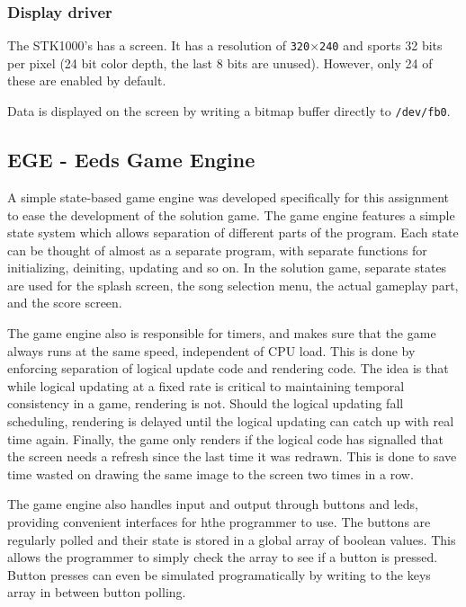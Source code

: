 \subsubsection{Display driver}
The STK1000's has a screen.
It has a resolution of \texttt{320}$\times$\texttt{240} and sports 32 bits per pixel (24 bit color depth, the last 8 bits are unused)\cite{lab-compendium}.
However, only 24 of these are enabled by default\cite{avr32-disp}.

Data is displayed on the screen by writing a bitmap buffer directly to \texttt{/dev/fb0}.


        \subsection{EGE  - Eeds Game Engine}

    A simple state-based game engine was developed specifically for this assignment to ease the development of the solution game.
    The game engine features a simple state system which allows separation of different parts of the program.
    Each state can be thought of almost as a separate program, with separate functions for initializing, deiniting, updating and so on.
    In the solution game, separate states are used for the splash screen, the song selection menu, the actual gameplay part, and the score screen.

    The game engine also is responsible for timers, and makes sure that the game always runs at the same speed, independent of CPU load.
    This is done by enforcing separation of logical update code and rendering code.
    The idea is that while logical updating at a fixed rate is critical to maintaining temporal consistency in a game, rendering is not.
    Should the logical updating fall scheduling, rendering is delayed until the logical updating can catch up with real time again.
    Finally, the game only renders if the logical code has signalled that the screen needs a refresh since the last time it was redrawn. This is done to save time wasted on drawing the same image to the screen two times in a row.

    The game engine also handles input and output through buttons and leds, providing convenient interfaces for hthe programmer to use.
    The buttons are regularly polled and their state is stored in a global array of boolean values.
    This allows the programmer to simply check the array to see if a button is pressed.
    Button presses can even be simulated programatically by writing to the keys array in between button polling.



